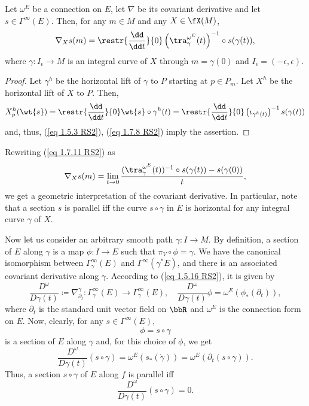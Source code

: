 \begin{prop}[{{\cite[Prop.~1.7.17]{RS2}}}]\label{prop 1.7.17 RS2}
    Let $\omega^E$ be a connection on $E$, let $\nabla$ be its covariant derivative and let $s\in\Gamma^\infty(E)$. Then, for any $m\in M$ and any $X\in\fX(M)$,
    \[\nabla_X s(m)=\restr{\frac{\dd}{\dd t}}{0}\left(\tra_\gamma^{\omega^E}(t)\right)^{-1}\circ s(\gamma(t)),\label{eq 1.7.11 RS2}\]
    where $\gamma:I_\epsilon\to M$ is an integral curve of $X$ through $m=\gamma(0)$ and $I_\epsilon=(-\epsilon,\epsilon)$.
\end{prop}
\begin{proof}
    Let $\gamma^h$ be the horizontal lift of $\gamma$ to $P$ starting at $p\in P_m$. Let $X^h$ be the horizontal lift of $X$ to $P$. Then,
    \[X_p^h(\wt{s})=\restr{\frac{\dd}{\dd t}}{0}\wt{s}\circ \gamma^h(t)=\restr{\frac{\dd}{\dd t}}{0}\left(\iota_{\gamma^h(t)}\right)^{-1}s(\gamma(t))\]
    and, thus, (\ref{eq 1.5.3 RS2}), (\ref{eq 1.7.8 RS2}) imply the assertion.
\end{proof}
Rewriting (\ref{eq 1.7.11 RS2}) as
\[\nabla_X s(m)=\lim_{t\to 0}\frac{(\tra_{\gamma}^{\omega^E}(t))^{-1}\circ s(\gamma(t))-s(\gamma(0))}{t},\]
we get a geometric interpretation of the covariant derivative. In particular, note that a section $s$ is parallel iff the curve $s\circ \gamma$ in $E$ is horizontal for any integral curve $\gamma$ of $X$.

Now let us consider an arbitrary smooth path $\gamma:I\to M$. By definition, a section of $E$ along $\gamma$ is a map $\phi:I\to E$ such that $\pi_V\circ \phi=\gamma$. We have the canonical isomorphism between $\Gamma_\gamma^\infty(E)$ and $\Gamma^\infty(\gamma^\ast E)$, and there is an associated covariant derivative along $\gamma$. According to (\ref{eq 1.5.16 RS2}), it is given by
\[\frac{D^\omega}{D\gamma(t)}\coloneqq \nabla^\gamma_{\partial_t}:\Gamma^\infty_\gamma(E)\to \Gamma^\infty_\gamma(E),\quad \frac{D^\omega}{D\gamma(t)}\phi=\omega^E\left(\phi_\ast(\partial_t)\right),\label{eq 1.7.13 RS2}\]
where $\partial_t$ is the standard unit vector field on $\bbR$ and $\omega^E$ is the connection form on $E$. Now, clearly, for any $s\in\Gamma^\infty(E)$,
\[\phi=s\circ\gamma\]
is a section of $E$ along $\gamma$ and, for this choice of $\phi$, we get
\[\frac{D^\omega}{D\gamma(t)}(s\circ\gamma)=\omega^E(s_\ast(\dot\gamma))=\omega^E(\partial_t(s\circ \gamma)).\label{eq 1.7.14 RS2}\]
Thus, a section $s\circ\gamma$ of $E$ along $f$ is parallel iff
\[\frac{D^\omega}{D\gamma(t)}(s\circ\gamma)=0.\label{eq 1.7.15 RS2}\]

